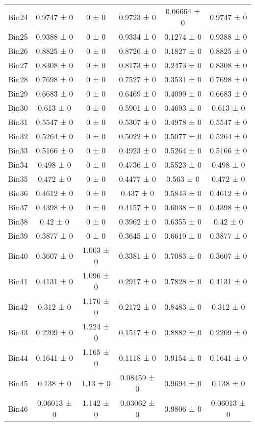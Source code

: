 \begin{tabular}{@{\extracolsep{4pt}}lccccc@{}}
     Bin24 & 0.9747 ± 0 & 0 ± 0 & 0.9723 ± 0 & 0.06664 ± 0 & 0.9747 ± 0 \\ 
     Bin25 & 0.9388 ± 0 & 0 ± 0 & 0.9334 ± 0 & 0.1274 ± 0 & 0.9388 ± 0 \\ 
     Bin26 & 0.8825 ± 0 & 0 ± 0 & 0.8726 ± 0 & 0.1827 ± 0 & 0.8825 ± 0 \\ 
     Bin27 & 0.8308 ± 0 & 0 ± 0 & 0.8173 ± 0 & 0.2473 ± 0 & 0.8308 ± 0 \\ 
     Bin28 & 0.7698 ± 0 & 0 ± 0 & 0.7527 ± 0 & 0.3531 ± 0 & 0.7698 ± 0 \\ 
     Bin29 & 0.6683 ± 0 & 0 ± 0 & 0.6469 ± 0 & 0.4099 ± 0 & 0.6683 ± 0 \\ 
     Bin30 & 0.613 ± 0 & 0 ± 0 & 0.5901 ± 0 & 0.4693 ± 0 & 0.613 ± 0 \\ 
     Bin31 & 0.5547 ± 0 & 0 ± 0 & 0.5307 ± 0 & 0.4978 ± 0 & 0.5547 ± 0 \\ 
     Bin32 & 0.5264 ± 0 & 0 ± 0 & 0.5022 ± 0 & 0.5077 ± 0 & 0.5264 ± 0 \\ 
     Bin33 & 0.5166 ± 0 & 0 ± 0 & 0.4923 ± 0 & 0.5264 ± 0 & 0.5166 ± 0 \\ 
     Bin34 & 0.498 ± 0 & 0 ± 0 & 0.4736 ± 0 & 0.5523 ± 0 & 0.498 ± 0 \\ 
     Bin35 & 0.472 ± 0 & 0 ± 0 & 0.4477 ± 0 & 0.563 ± 0 & 0.472 ± 0 \\ 
     Bin36 & 0.4612 ± 0 & 0 ± 0 & 0.437 ± 0 & 0.5843 ± 0 & 0.4612 ± 0 \\ 
     Bin37 & 0.4398 ± 0 & 0 ± 0 & 0.4157 ± 0 & 0.6038 ± 0 & 0.4398 ± 0 \\ 
     Bin38 & 0.42 ± 0 & 0 ± 0 & 0.3962 ± 0 & 0.6355 ± 0 & 0.42 ± 0 \\ 
     Bin39 & 0.3877 ± 0 & 0 ± 0 & 0.3645 ± 0 & 0.6619 ± 0 & 0.3877 ± 0 \\ 
     Bin40 & 0.3607 ± 0 & 1.003 ± 0 & 0.3381 ± 0 & 0.7083 ± 0 & 0.3607 ± 0 \\ 
     Bin41 & 0.4131 ± 0 & 1.096 ± 0 & 0.2917 ± 0 & 0.7828 ± 0 & 0.4131 ± 0 \\ 
     Bin42 & 0.312 ± 0 & 1.176 ± 0 & 0.2172 ± 0 & 0.8483 ± 0 & 0.312 ± 0 \\ 
     Bin43 & 0.2209 ± 0 & 1.224 ± 0 & 0.1517 ± 0 & 0.8882 ± 0 & 0.2209 ± 0 \\ 
     Bin44 & 0.1641 ± 0 & 1.165 ± 0 & 0.1118 ± 0 & 0.9154 ± 0 & 0.1641 ± 0 \\ 
     Bin45 & 0.138 ± 0 & 1.13 ± 0 & 0.08459 ± 0 & 0.9694 ± 0 & 0.138 ± 0 \\ 
     Bin46 & 0.06013 ± 0 & 1.142 ± 0 & 0.03062 ± 0 & 0.9806 ± 0 & 0.06013 ± 0 \\ 

\end{tabular}
